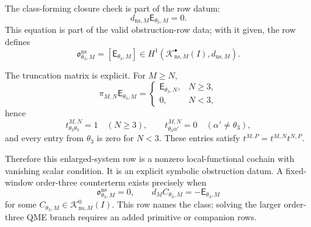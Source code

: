 \begin{prop}
  The class-forming closure check is part of the row datum:
  \[
    d_{\mathrm{ns},M}\mathsf E_{\theta_3,M}=0.
  \]
  This equation is part of the valid obstruction-row data; with it
  given, the row defines
  \[
    \mathfrak o^{\mathrm{ns}}_{\theta_3,M}
      =
    [\mathsf E_{\theta_3,M}]
      \in
    H^1\!\left(
      \mathcal K^\bullet_{\mathrm{ns},M}(I),d_{\mathrm{ns},M}
    \right).
  \]

  The truncation matrix is explicit.  For \(M\geq N\),
  \[
    \pi_{M,N}\mathsf E_{\theta_3,M}
      =
    \begin{cases}
      \mathsf E_{\theta_3,N}, & N\geq3,\\
      0, & N<3,
    \end{cases}
  \]
  hence
  \[
    t^{M,N}_{\theta_3\theta_3}=1\quad(N\geq3),\qquad
    t^{M,N}_{\theta_3\alpha'}=0\quad(\alpha'\neq\theta_3),
  \]
  and every entry from \(\theta_3\) is zero for \(N<3\).  These entries
  satisfy \(t^{M,P}=t^{M,N}t^{N,P}\).

  Therefore this enlarged-system row is a nonzero local-functional
  cochain with vanishing scalar condition.  It is an explicit symbolic
  obstruction datum.  A fixed-window order-three counterterm exists
  precisely when
  \[
    \mathfrak o^{\mathrm{ns}}_{\theta_3,M}=0,
    \qquad
    d_M C_{\theta_3,M}=-\mathsf E_{\theta_3,M}
  \]
  for some \(C_{\theta_3,M}\in\mathcal K^0_{\mathrm{ns},M}(I)\).  This
  row names the class; solving the larger order-three QME branch requires
  an added primitive or companion rows.
\end{prop}

